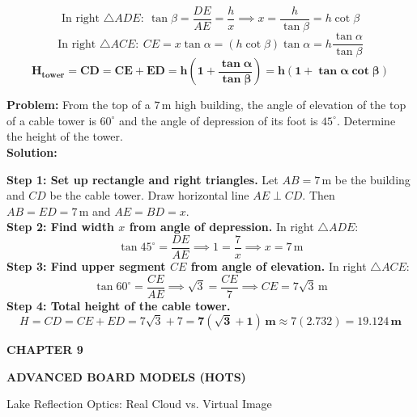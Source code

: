 \documentclass[10pt,a4paper]{article}
\newcommand{\chapterbanner}[4]{%
  \begin{tcolorbox}[enhanced,colback=bluepale,colframe=bluepale,boxrule=0pt,arc=2mm,
    left=4mm,right=4mm,top=2mm,bottom=2mm]
    {\footnotesize\bfseries\color{gold}CHAPTER #1\hfill\color{blue}#4}\par\vspace{0.6mm}
    {\LARGE\bfseries\color{navy}#2}\par
    {\small\color{muted}#3}
  \end{tcolorbox}\vspace{1mm}
}
\newcommand{\WorkedTag}{\tcbox[colback=bluepale,colframe=blue!25,boxrule=.3pt,arc=1mm,left=1.5mm,right=1.5mm,top=.5mm,bottom=.5mm]{\scriptsize\bfseries\color{blue}WORKED MODEL}}
\begin{document}
\vspace{0.8mm}
\begin{formulaBox}[title=Governing Formula for Building-to-Tower Observation,fonttitle=\bfseries\color{navy}]
  $$\text{In right }\triangle ADE:\ \tan\beta = \frac{DE}{AE} = \frac{h}{x} \implies x = \frac{h}{\tan\beta} = h\cot\beta$$
  $$\text{In right }\triangle ACE:\ CE = x\tan\alpha = (h\cot\beta)\tan\alpha = h\frac{\tan\alpha}{\tan\beta}$$
  $$\mathbf{H_{\text{tower}} = CD = CE + ED = h\left(1 + \frac{\tan\alpha}{\tan\beta}\right) = h(1 + \tan\alpha\cot\beta)}$$
\end{formulaBox}

\vspace{0.5mm}
\begin{conceptBox}[title=Worked Board Archetype: 7m Building and Cable Tower,fonttitle=\bfseries\color{navy}]
  \textbf{Problem:} From the top of a $7\,\text{m}$ high building, the angle of elevation of the top of a cable tower is $60^\circ$ and the angle of depression of its foot is $45^\circ$. Determine the height of the tower. \\
  \textbf{Solution:}\par
  \textbf{Step 1: Set up rectangle and right triangles.} Let $AB = 7\,\text{m}$ be the building and $CD$ be the cable tower. Draw horizontal line $AE \perp CD$. Then $AB = ED = 7\,\text{m}$ and $AE = BD = x$. \\
  \textbf{Step 2: Find width $x$ from angle of depression.} In right $\triangle ADE$:
  $$\tan 45^\circ = \frac{DE}{AE} \implies 1 = \frac{7}{x} \implies x = 7\,\text{m}$$
  \textbf{Step 3: Find upper segment $CE$ from angle of elevation.} In right $\triangle ACE$:
  $$\tan 60^\circ = \frac{CE}{AE} \implies \sqrt{3} = \frac{CE}{7} \implies CE = 7\sqrt{3}\,\text{m}$$
  \textbf{Step 4: Total height of the cable tower.}
  $$H = CD = CE + ED = 7\sqrt{3} + 7 = \mathbf{7(\sqrt{3} + 1)\,\text{m}} \approx 7(2.732) = \mathbf{19.124\,\text{m}}$$
\end{conceptBox}

\newpage

\thispagestyle{fancy}
\vspace*{0mm}

\chapterbanner{9}{ADVANCED BOARD MODELS (HOTS)}{Lake Reflection Optics: Real Cloud vs. Virtual Image}{\WorkedTag}
\end{document}
